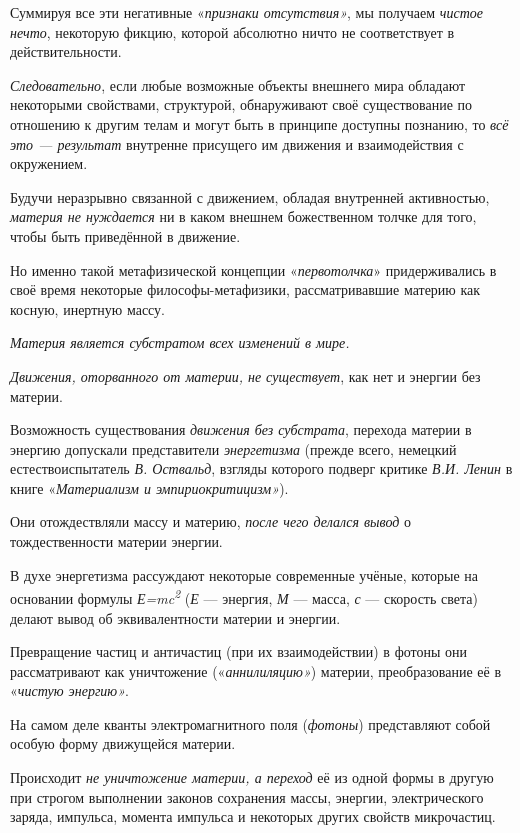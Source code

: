 \documentclass[a4paper,14pt,russian]{extreport}
\begin{document}
Суммируя все эти негативные «\emph{признаки отсутствия»}, мы получаем \emph{чистое нечто}, некоторую фикцию, которой абсолютно ничто не соответствует в действительности.

\emph{Следовательно}, если любые возможные объекты внешнего мира обладают некоторыми свойствами, структурой, обнаруживают своё существование по отношению к другим телам и могут быть в принципе доступны познанию, то \emph{всё это --- результат} внутренне присущего им движения и взаимодействия с окружением.

Будучи неразрывно связанной с движением, обладая внутренней активностью, \emph{материя не нуждается} ни в каком внешнем божественном толчке для того, чтобы быть приведённой в движение.

Но именно такой метафизической концепции «\emph{первотолчка}» придерживались в своё время некоторые философы-метафизики, рассматривавшие материю как косную, инертную массу.

\emph{Материя является субстратом всех изменений в мире.}

\emph{Движения, оторванного от материи, не существует}, как нет и энергии без материи.

Возможность существования \emph{движения без субстрата}, перехода материи в энергию допускали представители \emph{энергетизма} (прежде всего, немецкий естествоиспытатель \emph{В. Оствальд}, взгляды которого подверг критике \emph{В.И. Ленин} в книге «\emph{Материализм и эмпириокритицизм»}).

Они отождествляли массу и материю, \emph{после чего делался вывод} о тождественности материи энергии.

В духе энергетизма рассуждают некоторые современные учёные, которые на основании формулы \emph{Е=mc\textsuperscript{2}} (\emph{Е} --- энергия, \emph{М} --- масса, \emph{с} --- скорость света) делают вывод об эквивалентности материи и энергии.

Превращение частиц и античастиц (при их взаимодействии) в фотоны они рассматривают как уничтожение («\emph{аннилиляцию»}) материи, преобразование её в «\emph{чистую энергию»}.

На самом деле кванты электромагнитного поля (\emph{фотоны}) представляют собой особую форму движущейся материи.

Происходит \emph{не уничтожение материи, а переход} её из одной формы в другую при строгом выполнении законов сохранения массы, энергии, электрического заряда, импульса, момента импульса и некоторых других свойств микрочастиц.
\end{document}
